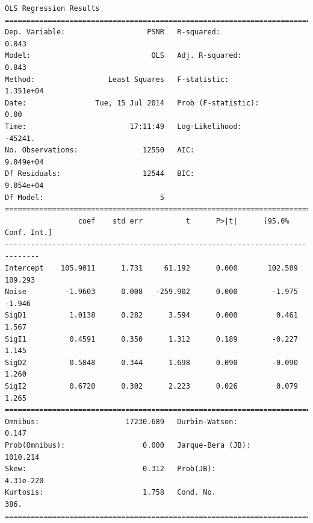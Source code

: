 \documentclass[11pt]{article}
\theoremstyle{definition}
\begin{document}
{\footnotesize
\begin{lstlisting}[caption = Time Series 1 - Bilateral Filter 2 Different Iterations OLS Model, label = {2diffbilateral1}]
                            OLS Regression Results                            
==============================================================================
Dep. Variable:                   PSNR   R-squared:                       0.843
Model:                            OLS   Adj. R-squared:                  0.843
Method:                 Least Squares   F-statistic:                 1.351e+04
Date:                Tue, 15 Jul 2014   Prob (F-statistic):               0.00
Time:                        17:11:49   Log-Likelihood:                -45241.
No. Observations:               12550   AIC:                         9.049e+04
Df Residuals:                   12544   BIC:                         9.054e+04
Df Model:                           5                                         
==============================================================================
                 coef    std err          t      P>|t|      [95.0% Conf. Int.]
------------------------------------------------------------------------------
Intercept    105.9011      1.731     61.192      0.000       102.509   109.293
Noise         -1.9603      0.008   -259.902      0.000        -1.975    -1.946
SigD1          1.0138      0.282      3.594      0.000         0.461     1.567
SigI1          0.4591      0.350      1.312      0.189        -0.227     1.145
SigD2          0.5848      0.344      1.698      0.090        -0.090     1.260
SigI2          0.6720      0.302      2.223      0.026         0.079     1.265
==============================================================================
Omnibus:                    17230.689   Durbin-Watson:                   0.147
Prob(Omnibus):                  0.000   Jarque-Bera (JB):             1010.214
Skew:                           0.312   Prob(JB):                    4.31e-220
Kurtosis:                       1.758   Cond. No.                         386.
==============================================================================
\end{lstlisting}

}
\end{document}
